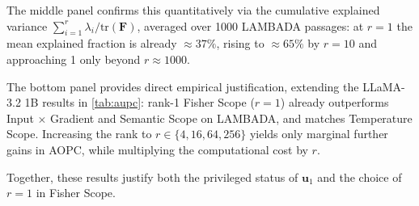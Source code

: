 \documentclass{article}
\begin{document}
The middle panel confirms this quantitatively via the cumulative explained variance $\sum_{i=1}^r \lambda_i / \mathrm{tr}(\bm{F})$, averaged over 1000 LAMBADA passages: 
at $r=1$ the mean explained fraction is already $\approx 37\%$, rising to $\approx 65\%$ by $r=10$ and approaching 1 only beyond $r \approx 1000$.

The bottom panel provides direct empirical justification, extending the LLaMA-3.2 1B results in \cref{tab:aupc}: rank-1 Fisher Scope ($r=1$) already outperforms Input $\times$ Gradient and Semantic Scope on LAMBADA, and matches Temperature Scope.
Increasing the rank to $r \in \{4, 16, 64, 256\}$ yields only marginal further gains in AOPC, while multiplying the computational cost by $r$.

Together, these results justify both the privileged status of $\bm{u}_1$ and the choice of $r=1$ in Fisher Scope.


% 
\end{document}
